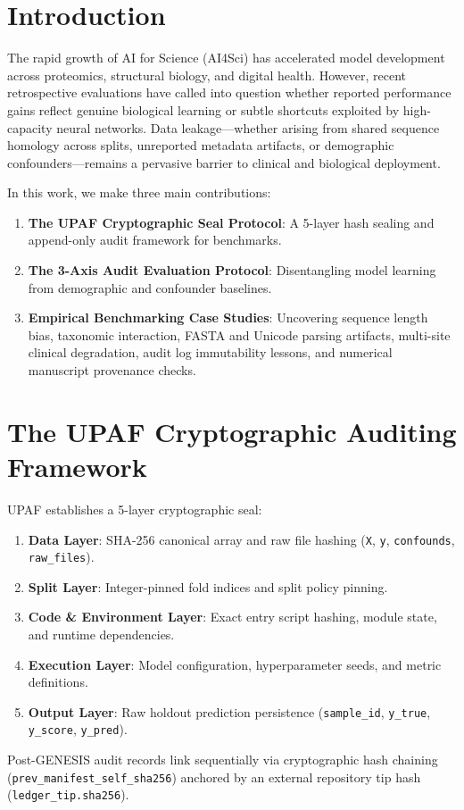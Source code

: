 \documentclass[submittal,11pt]{article}
\begin{document}
\section{Introduction}
The rapid growth of AI for Science (AI4Sci) has accelerated model development across proteomics, structural biology, and digital health. However, recent retrospective evaluations have called into question whether reported performance gains reflect genuine biological learning or subtle shortcuts exploited by high-capacity neural networks. Data leakage—whether arising from shared sequence homology across splits, unreported metadata artifacts, or demographic confounders—remains a pervasive barrier to clinical and biological deployment.

In this work, we make three main contributions:
\begin{enumerate}
    \item \textbf{The UPAF Cryptographic Seal Protocol}: A 5-layer hash sealing and append-only audit framework for benchmarks.
    \item \textbf{The 3-Axis Audit Evaluation Protocol}: Disentangling model learning from demographic and confounder baselines.
    \item \textbf{Empirical Benchmarking Case Studies}: Uncovering sequence length bias, taxonomic interaction, FASTA and Unicode parsing artifacts, multi-site clinical degradation, audit log immutability lessons, and numerical manuscript provenance checks.
\end{enumerate}

\section{The UPAF Cryptographic Auditing Framework}
UPAF establishes a 5-layer cryptographic seal:
\begin{enumerate}
    \item \textbf{Data Layer}: SHA-256 canonical array and raw file hashing (\texttt{X}, \texttt{y}, \texttt{confounds}, \texttt{raw\_files}).
    \item \textbf{Split Layer}: Integer-pinned fold indices and split policy pinning.
    \item \textbf{Code \& Environment Layer}: Exact entry script hashing, module state, and runtime dependencies.
    \item \textbf{Execution Layer}: Model configuration, hyperparameter seeds, and metric definitions.
    \item \textbf{Output Layer}: Raw holdout prediction persistence (\texttt{sample\_id}, \texttt{y\_true}, \texttt{y\_score}, \texttt{y\_pred}).
\end{enumerate}
Post-GENESIS audit records link sequentially via cryptographic hash chaining (\texttt{prev\_manifest\_self\_sha256}) anchored by an external repository tip hash (\texttt{ledger\_tip.sha256}).
\end{document}
